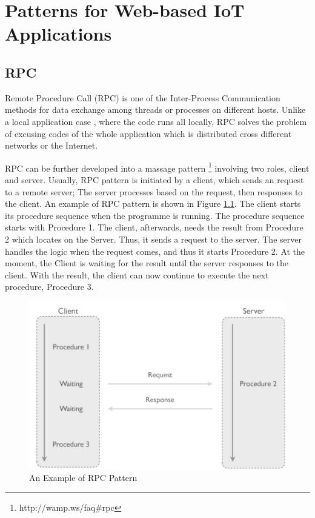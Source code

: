 \chapter{Patterns for Web-based IoT Applications}
\label{chapter:Patternsforweb-basedIoTapplications}

\section{RPC}
Remote Procedure Call (RPC) is one of the Inter-Process Communication methods for data exchange among threads or processes on different hosts. Unlike a local application case \cite{srinivasan1995rpc}, where the code runs all locally, RPC solves the problem of excusing codes of the whole application which is distributed cross different networks or the Internet.

RPC can be further developed into a massage pattern \footnote{http://wamp.ws/faq\#rpc} involving two roles, client and server. Usually, RPC pattern is initiated by a client, which sends an request to a remote server; The server processes based on the request, then responses to the client. An example of RPC pattern is shown in Figure \ref{fig:RPC-pattern}. The client starts its procedure sequence when the programme is running. The procedure sequence starts with Procedure 1. The client, afterwards, needs the result from Procedure 2 which locates on the Server. Thus, it sends a request to the server. The server handles the logic when the request comes, and thus it starts Procedure 2. At the moment, the Client is waiting for the result until the server responses to the client. With the result, the client can now continue to execute the next procedure, Procedure 3.  

\begin{figure}[ht]
  \begin{center}
    \includegraphics[width=1\textwidth]{images/RPC-pattern.pdf}
    \caption{An Example of RPC Pattern}
    \label{fig:RPC-pattern}
  \end{center}
\end{figure}

